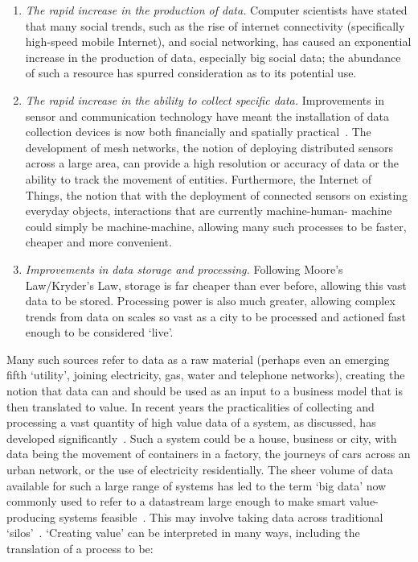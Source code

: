 \documentclass[journal]{IEEEtran}
\begin{document}
\begin{enumerate}
\item {\emph{The rapid increase in the production of data.}}
Computer scientists have stated that many social trends, such as the
rise of internet connectivity (specifically high-speed mobile
Internet), and social networking, has caused an exponential increase
in the production of data, especially big social data; the
abundance of such a resource has spurred consideration as to its
potential use.
\item {\emph{The rapid increase in the ability to collect specific
data.}} Improvements in sensor and communication technology have meant
the installation of data collection devices is now both financially
and spatially practical~\cite{townsend:2013}. The development of mesh
networks, the notion of deploying distributed sensors across a large
area, can provide a high resolution or accuracy of data or the ability
to track the movement of entities. Furthermore, the Internet of
Things, the notion that with the deployment of connected sensors on
existing everyday objects, interactions that are currently
machine-human- machine could simply be machine-machine, allowing many
such processes to be faster, cheaper and more convenient.
\item {\emph{Improvements in data storage and processing.}}
Following Moore's Law/Kryder's Law, storage is far cheaper than ever
before, allowing this vast data to be stored. Processing power is also
much greater, allowing complex trends from data on scales so vast as a
city to be processed and actioned fast enough to be considered `live'.
\end{enumerate}

Many such sources refer to data as a raw material (perhaps even an
emerging fifth `utility', joining electricity, gas, water and
telephone networks), creating the notion that data can and should be
used as an input to a business model that is then translated to
value. In recent years the practicalities of collecting and processing
a vast quantity of high value data of a system, as discussed, has
developed significantly~\cite{arup-et-al:2011}. Such a system could be
a house, business or city, with data being the movement of containers
in a factory, the journeys of cars across an urban network, or the use
of electricity residentially. The sheer volume of data available for
such a large range of systems has led to the term `big data' now
commonly used to refer to a datastream large enough to make smart
value-producing systems
feasible~\cite{hollands:2008,ibmsmartcities:2009,ciscoconcities:2010}. This
may involve taking data across traditional
`silos'~\cite{shapiro:2006,tsoukalas:2008}. `Creating value' can be
interpreted in many ways, including the translation of a process to
be:
\end{document}
